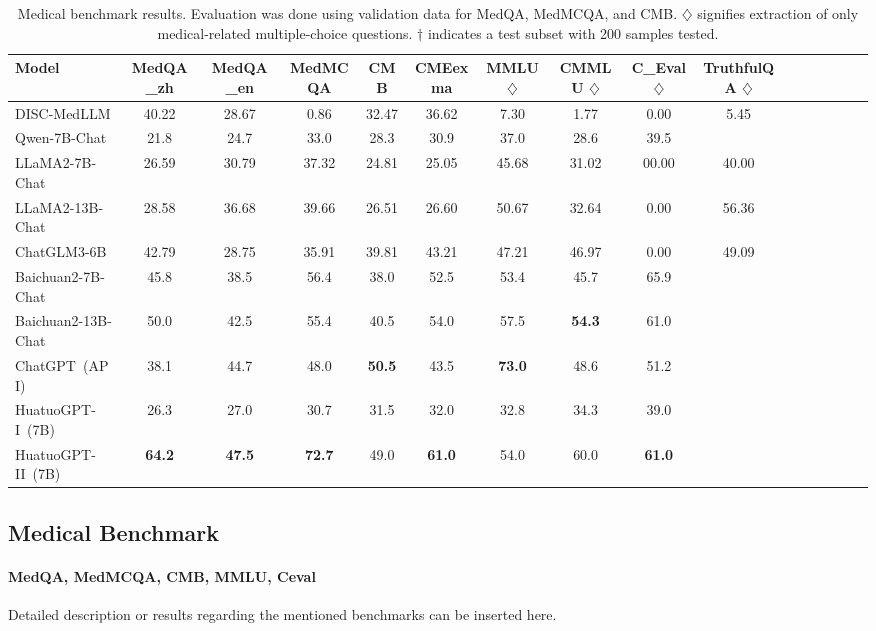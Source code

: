 \documentclass{article} %
\begin{document}
\begin{table}[h]
\centering
\begin{tabular}{lccccccccccccccc}
\toprule
\textbf{Model}              & \textbf{MedQA\_zh}  & \textbf{MedQA\_en} & \textbf{MedMCQA} & \textbf{CMB} & \textbf{CMEexma} & \textbf{MMLU} $\diamondsuit$ & \textbf{CMMLU} $\diamondsuit$ & \textbf{C\_Eval} $\diamondsuit$ & \textbf{TruthfulQA} $\diamondsuit$ \\
\hline
DISC-MedLLM  & 40.22 & 28.67 & 0.86 & 32.47 & 36.62 & 7.30 & 1.77 & 0.00 & 5.45  \\
Qwen-7B-Chat  & 21.8      & 24.7  & 33.0  & 28.3    & 30.9 & 37.0 & 28.6 & 39.5  \\
LLaMA2-7B-Chat  & 26.59      & 30.79  & 37.32  & 24.81    & 25.05 & 45.68 & 31.02 & 00.00 & 40.00  \\
LLaMA2-13B-Chat  & 28.58 & 36.68 & 39.66 & 26.51 & 26.60 & 50.67 & 32.64 & 0.00 & 56.36  \\
ChatGLM3-6B   & 42.79 & 28.75 & 35.91 & 39.81 & 43.21 & 47.21 & 46.97 & 0.00 & 49.09  \\
Baichuan2-7B-Chat  & 45.8      & 38.5  & 56.4  & 38.0    & 52.5 & 53.4 & 45.7 & 65.9  \\
Baichuan2-13B-Chat & 50.0      & 42.5  & 55.4  & 40.5    & 54.0 & 57.5 &\textbf{ 54.3} & 61.0 \\
ChatGPT~(API) & 38.1      & 44.7  & 48.0  & \textbf{50.5}    & 43.5 & \textbf{73.0} & 48.6 & 51.2 \\
HuatuoGPT-I~(7B) & 26.3      & 27.0  & 30.7  & 31.5    & 32.0 & 32.8 & 34.3 & 39.0 \\
HuatuoGPT-II~(7B)   & \textbf{64.2}      & \textbf{47.5}  & \textbf{72.7}  & 49.0    &\textbf{ 61.0 }& 54.0 & 60.0 & \textbf{61.0 }\\
\midrule
\end{tabular}
\caption{Medical benchmark results. Evaluation was done using validation data for MedQA, MedMCQA, and CMB. $\diamondsuit$ signifies extraction of only medical-related multiple-choice questions. $\dag$ indicates a test subset with 200 samples tested.}


\label{table:medical_benchmark}
\end{table}

\subsection{Medical Benchmark}
    \paragraph{MedQA, MedMCQA, CMB, MMLU, Ceval}
    Detailed description or results regarding the mentioned benchmarks can be inserted here.
    
\end{document}
